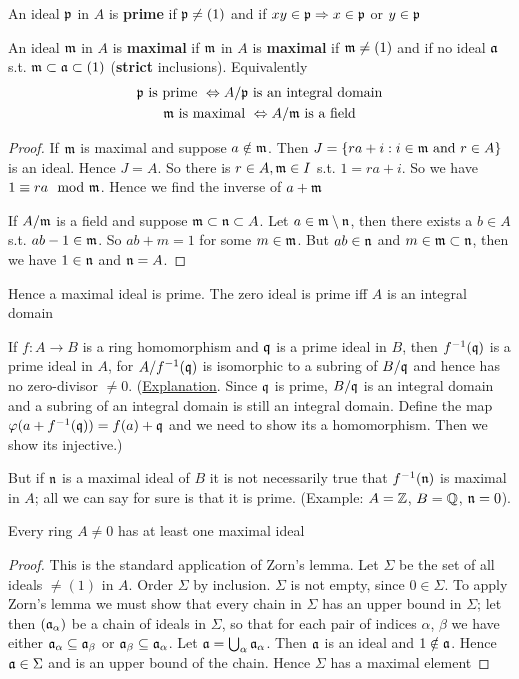 \documentclass[11pt]{article}
\begin{document}
An ideal \(\mathfrak{p}\) in \(A\) is \textbf{prime} if \(\mathfrak{p}\neq(1)\) and if \(xy\in\mathfrak{p}\Rightarrow x\in\mathfrak{p}\) or \(y\in\mathfrak{p}\)

An ideal \(\mathfrak{m}\) in \(A\) is \textbf{maximal} if \(\mathfrak{m}\) in \(A\) is \textbf{maximal} if \(\mathfrak{m}\neq(1)\) and if no
ideal \(\mathfrak{a}\) s.t. \(\mathfrak{m}\subset\mathfrak{a}\subset(1)\) (\textbf{strict} inclusions). Equivalently
\begin{gather*}
\mathfrak{p}\text{ is prime } \Leftrightarrow A/\mathfrak{p}\text{ is an integral domain}\\
\mathfrak{m}\text{ is maximal } \Leftrightarrow A/\mathfrak{m}\text{ is a field}
\end{gather*}
\begin{proof}
If \(\mathfrak{m}\) is maximal and suppose \(a\notin\mathfrak{m}\). Then \(J=\{ra+i:i\in \mathfrak{m}\text{ and }r\in A\}\) is an ideal.
Hence \(J=A\). So there is \(r\in A, \mathfrak{m}\in I\) s.t. \(1=ra+i\). So we have \(1\equiv ra\mod {\mathfrak{m}}\). Hence we
find the inverse of \(a+\mathfrak{m}\)

If \(A/\mathfrak{m}\) is a field and suppose \(\mathfrak{m}\subset\mathfrak{n}\subset A\). Let \(a\in\mathfrak{m}\setminus\mathfrak{n}\), then there exists a \(b\in A\)
s.t. \(ab-1\in\mathfrak{m}\). So \(ab+m=1\) for some \(m\in\mathfrak{m}\). But \(ab\in\mathfrak{n}\) and \(m\in\mathfrak{m}\subset\mathfrak{n}\), then we
have \(1\in\mathfrak{n}\) and \(\mathfrak{n}=A\).
\end{proof}

Hence a maximal ideal is prime. The zero ideal is prime iff \(A\) is an integral domain

If \(f:A\to B\) is a ring homomorphism and \(\mathfrak{q}\) is a prime ideal in \(B\), then \(f^{-1}(\mathfrak{q})\) is
a prime ideal in \(A\), for \(A/f^{-1}(\mathfrak{q})\) is isomorphic to a subring of \(B/\mathfrak{q}\) and hence has
no zero-divisor \(\neq 0\). (\href{https://asgarli.wordpress.com/2013/04/21/inverse-image-of-a-prime-ideal-is-prime/}{Explanation}. Since \(\mathfrak{q}\) is prime, \(B/\mathfrak{q}\) is an integral domain and a
subring of an integral domain is still an integral domain. Define the map
\(\varphi(a+f^{-1}(\mathfrak{q}))=f(a)+\mathfrak{q}\) and we need to show its a homomorphism. Then we show its injective.)

But if \(\mathfrak{n}\) is a maximal ideal of \(B\) it is not necessarily true that \(f^{-1}(\mathfrak{n})\) is
maximal in \(A\); all we can say for sure is that it is prime. (Example: \(A=\mathbb{Z}\), \(B=\mathbb{Q}\), \(\mathfrak{n}=0\)).

\begin{theorem}[]
\label{1.3}
Every ring \(A\neq 0\) has at least one maximal ideal
\end{theorem}

\begin{proof}
This is the standard application of Zorn's lemma. Let \(\Sigma\) be the set of all ideals \(\neq(1)\)
in \(A\). Order \(\Sigma\) by inclusion. \(\Sigma\) is not empty, since \(0\in\Sigma\). To apply Zorn's lemma we must
show that every chain in \(\Sigma\) has an upper bound in \(\Sigma\); let then \((\mathfrak{a}_\alpha)\) be a chain of ideals in
\(\Sigma\), so that for each pair of indices \(\alpha\), \(\beta\) we have either \(\mathfrak{a}_\alpha\subseteq \mathfrak{a}_\beta\) or \(\mathfrak{a}_\beta\subseteq\mathfrak{a}_\alpha\).
Let \(\mathfrak{a}=\bigcup_\alpha\mathfrak{a}_\alpha\). Then \(\mathfrak{a}\) is an ideal and \(1\notin\mathfrak{a}\). Hence \(\mathfrak{a}\in\Sigma\) and is an upper bound of the
chain. Hence \(\Sigma\) has a maximal element
\end{proof}
\end{document}
